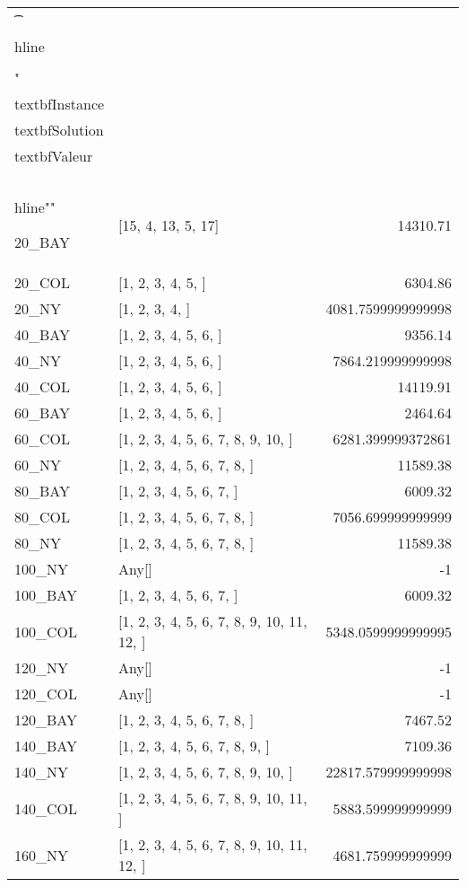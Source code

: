 \documentclass[main.tex]{subfiles}
\begin{document}
\begin{center}
\renewcommand{\arraystretch}{1.4} 
\begin{tabular}{llr}\n\t\\hline\n\\\\\n
"\\textbf{Instance} & \\textbf{Solution} & \\textbf{Valeur} \\\\\\hline\n""

20\_BAY & [15, 4, 13, 5, 17] & 14310.71\\
20\_COL & [1, 2, 3, 4, 5, ] & 6304.86\\
20\_NY & [1, 2, 3, 4, ] & 4081.7599999999998\\
40\_BAY & [1, 2, 3, 4, 5, 6, ] & 9356.14\\
40\_NY & [1, 2, 3, 4, 5, 6, ] & 7864.219999999998\\
40\_COL & [1, 2, 3, 4, 5, 6, ] & 14119.91\\
60\_BAY & [1, 2, 3, 4, 5, 6, ] & 2464.64\\
60\_COL & [1, 2, 3, 4, 5, 6, 7, 8, 9, 10, ] & 6281.399999372861\\
60\_NY & [1, 2, 3, 4, 5, 6, 7, 8, ] & 11589.38\\
80\_BAY & [1, 2, 3, 4, 5, 6, 7, ] & 6009.32\\
80\_COL & [1, 2, 3, 4, 5, 6, 7, 8, ] & 7056.699999999999\\
80\_NY & [1, 2, 3, 4, 5, 6, 7, 8, ] & 11589.38\\
100\_NY & Any[] & -1\\
100\_BAY & [1, 2, 3, 4, 5, 6, 7, ] & 6009.32\\
100\_COL & [1, 2, 3, 4, 5, 6, 7, 8, 9, 10, 11, 12, ] & 5348.0599999999995\\
120\_NY & Any[] & -1\\
120\_COL & Any[] & -1\\
120\_BAY & [1, 2, 3, 4, 5, 6, 7, 8, ] & 7467.52\\
140\_BAY & [1, 2, 3, 4, 5, 6, 7, 8, 9, ] & 7109.36\\
140\_NY & [1, 2, 3, 4, 5, 6, 7, 8, 9, 10, ] & 22817.579999999998\\
140\_COL & [1, 2, 3, 4, 5, 6, 7, 8, 9, 10, 11, ] & 5883.599999999999\\
160\_NY & [1, 2, 3, 4, 5, 6, 7, 8, 9, 10, 11, 12, ] & 4681.759999999999\\

\end{tabular}
\end{center}
\end{document}
